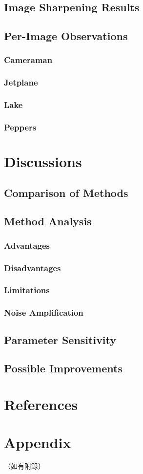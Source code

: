 \documentclass[12pt,a4paper]{article}
\begin{document}
\subsection{Image Sharpening Results}
\subsection{Per-Image Observations}
\subsubsection{Cameraman}\subsubsection{Jetplane}\subsubsection{Lake}\subsubsection{Peppers}

\section{Discussions}
\subsection{Comparison of Methods}
\subsection{Method Analysis}
\subsubsection{Advantages}\subsubsection{Disadvantages}\subsubsection{Limitations}\subsubsection{Noise Amplification}
\subsection{Parameter Sensitivity}
\subsection{Possible Improvements}

\section{References}



\section{Appendix}
（如有附錄）
\end{document}
